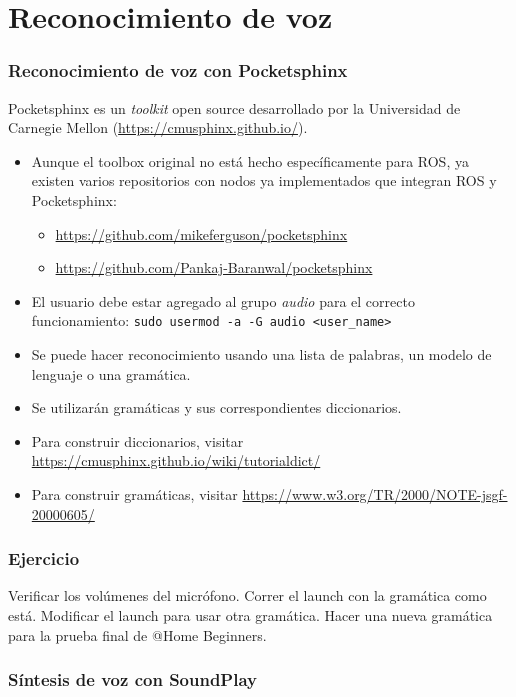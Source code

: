 \documentclass[10pt,spanish,aspectratio=1610]{beamer}
\begin{document}
\section{Reconocimiento de voz}
\begin{frame}\frametitle{Reconocimiento de voz con Pocketsphinx}
  Pocketsphinx es un \textit{toolkit} open source desarrollado por la Universidad de Carnegie Mellon (\url{https://cmusphinx.github.io/}).
  \begin{itemize}
  \item Aunque el toolbox original no está hecho específicamente para ROS, ya existen varios repositorios con nodos ya implementados que integran ROS y Pocketsphinx:
    \begin{itemize}
    \item \url{https://github.com/mikeferguson/pocketsphinx}
    \item \url{https://github.com/Pankaj-Baranwal/pocketsphinx}
    \end{itemize}
  \item El usuario debe estar agregado al grupo \textit{audio} para el correcto funcionamiento: \texttt{sudo usermod -a -G audio <user\_name>}
  \end{itemize}
  \begin{itemize}
  \item Se puede hacer reconocimiento usando una lista de palabras, un modelo de lenguaje o una gramática.
  \item Se utilizarán gramáticas y sus correspondientes diccionarios.
  \item Para construir diccionarios, visitar \url{https://cmusphinx.github.io/wiki/tutorialdict/}
  \item Para construir gramáticas, visitar \url{https://www.w3.org/TR/2000/NOTE-jsgf-20000605/}
  \end{itemize}
\end{frame}

\begin{frame}\frametitle{Ejercicio}
  Verificar los volúmenes del micrófono. Correr el launch con la gramática como está. Modificar el launch para usar otra gramática. Hacer una nueva gramática para la prueba final de @Home Beginners.
  
\end{frame}

\begin{frame}\frametitle{Síntesis de voz con SoundPlay}
  
\end{frame}
\end{document}
